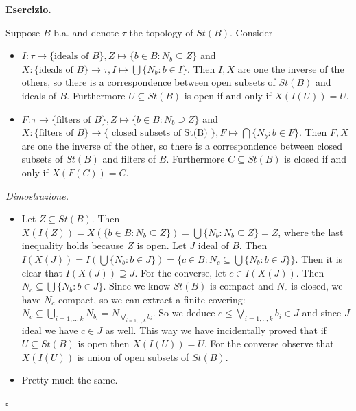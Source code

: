 \documentclass[a4paper,12pt]{article}
\newenvironment{exercise}
  {\par\vspace{1em}\noindent\textbf{Esercizio.} }
  {\par\vspace{1em}}
\newenvironment{proof}
  {\par\vspace{0.5em}\noindent\textit{Dimostrazione.} }
  {\par\vspace{1em}\hfill$\square$}
\begin{document}
\begin{exercise}

	Suppose $B$ b.a. and denote $\tau$ the topology of $St(B)$. Consider
	\begin{itemize}
		\item	$I: \tau \to \{\text{ideals of }B\}, Z \mapsto \{b \in B : N_b \subseteq Z\} $ and $X: \{\text{ideals of }B \} \to \tau, I \mapsto \bigcup\{N_b : b \in I\}$.
			Then $I,X$ are one the inverse of the others, so there is a correspondence between open subsets of $St(B)$ and ideals of $B$.
			Furthermore $U \subseteq St(B)$ is open if and only if $X(I(U)) = U$.

		\item	$F: \tau \to \{\text{filters of }B\}, Z \mapsto \{b \in B : N_b \supseteq Z\}$ and 
			$X: \{\text{filters of }B\} \to \{\text{ closed subsets of St(B) }\}, F \mapsto \bigcap\{N_b : b \in F\}$.
			Then $F,X$ are one the inverse of the other, so there is a correspondence between closed subsets of $St(B)$ and filters of $B$.
			Furthermore $C \subseteq St(B)$ is closed if and only if $X(F(C)) = C$.

	\end{itemize}

\end{exercise}

\begin{proof}

	\begin{itemize}
		\item	Let $Z \subseteq St(B)$. Then $X(I(Z)) = X( \{b \in B : N_b \subseteq Z\} ) = \bigcup\{ N_b : N_b \subseteq Z\} = Z$, where the last inequality holds because $Z$ is open.
			Let $J$ ideal of $B$. Then $I(X(J)) = I( \bigcup\{N_b : b \in J\}) = \{c \in B : N_c \subseteq \bigcup\{N_b : b \in J\}\}$.
			Then it is clear that $I(X(J)) \supseteq J$. For the converse, let $c \in I(X(J))$. Then $N_c \subseteq \bigcup\{N_b : b \in J\}$.
			Since we know $St(B)$ is compact and $N_c$ is closed, we have $N_c$ compact, so we can extract a finite covering: $N_c \subseteq \bigcup_{i=1,..,k} N_{b_i} = N_{\bigvee_{i=1,..,k} b_i}$.
			So we deduce $c \leq \bigvee_{i=1,..,k} b_i \in J$ and since $J$ ideal we have $c \in J$ as well.
			This way we have incidentally proved that if $U \subseteq St(B)$ is open then $X(I(U)) = U$.
			For the converse observe that $X(I(U))$ is union of open subsets of $St(B)$.


		\item	Pretty much the same.

	\end{itemize}

\end{proof}
\end{document}
